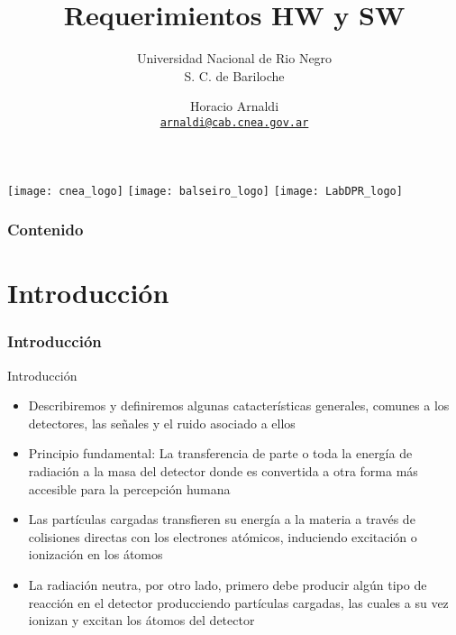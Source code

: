 \documentclass{beamer}
\title[Curso RedPitaya]{Requerimientos HW y SW}
\subtitle{Universidad Nacional de Rio Negro \\ S. C. de Bariloche}
\author[\texttt{@horacio\_arnaldi}]{Horacio Arnaldi \\ \texttt{{\href{mailto:arnaldi@cab.cnea.gov.ar}{arnaldi@cab.cnea.gov.ar}}}}
\institute[LabDPR - CAB - IB]{Laboratorio Detección de Partículas y Radiación \\ Centro Atómico Bariloche - Instituto Balseiro}
\date{}
\begin{document}
\begin{frame}
\hspace*{1.2cm}
\texttt{[image: cnea\_logo]} \hspace*{2cm}
\texttt{[image: balseiro\_logo]} \hspace*{2cm}
\texttt{[image: LabDPR\_logo]} %

\titlepage

\end{frame}

\begin{frame}
\frametitle{Contenido}
\setcounter{tocdepth}{1} %
\tableofcontents
\end{frame}

\section{Introducción}

\begin{frame}
\begin{center}
\Huge{\color{blue}{Introducción}}
\end{center}
\end{frame}

\begin{frame}
\frametitle{Introducción}
\end{frame}

\begin{frame}
\begin{block}{Introducción}
\begin{itemize}
\item Describiremos y definiremos algunas catacterísticas generales, comunes a los
detectores, las señales y el ruido asociado a ellos
\item Principio fundamental: \alert{La transferencia de parte o toda la energía
de radiación a la masa del detector donde es convertida a otra forma más
accesible para la percepción humana}
\item Las partículas cargadas transfieren su energía a la materia a través de
colisiones directas con los electrones atómicos, induciendo
{\color{blue}excitación} o {\color{blue}ionización} en los átomos
\item La radiación neutra, por otro lado, primero debe producir algún tipo de
reacción en el detector producciendo partículas cargadas, las cuales a su vez
ionizan y excitan los átomos del detector
\end{itemize}
\end{block}
\end{frame} 
\end{document}
